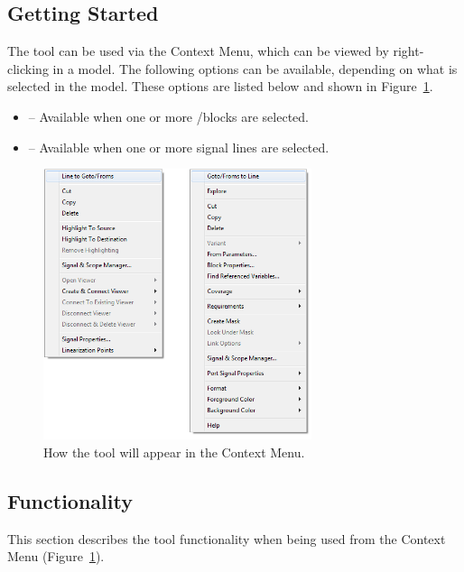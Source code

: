 \documentclass{article}
\newcommand{\menu}[2]{%
	\ifthenelse{\equal{#1}{1}}{Goto/Froms to Line}{}%
  	\ifthenelse{\equal{#1}{2}}{Line to Goto/Froms}{}%
}
\begin{document}
\subsection{Getting Started}
The tool can be used via the \Simulink Context Menu, which can be viewed by right-clicking in a model. The following options can be available, depending on what is selected in the model. These options are listed below and shown in Figure~\ref{FIG:contextMenu}.
\begin{itemize}
	\item \emph{} -- Available when one or more \goto/\from blocks are selected.
	\item \emph{} -- Available when one or more signal lines are selected.
\end{itemize}

\begin{figure}
	\centering
	\includegraphics[width=0.7\textwidth]{../figs/ContextMenu}
	\caption{How the tool will appear in the \Simulink Context Menu.}
	\label{FIG:contextMenu}
\end{figure}

\newpage
\subsection{Functionality}
This section describes the tool functionality when being used from the \Simulink Context Menu (Figure~\ref{FIG:contextMenu}).
\end{document}
